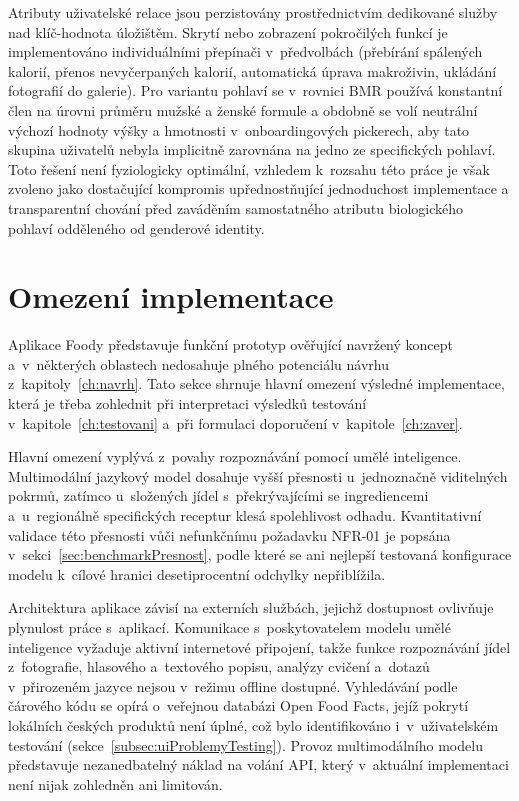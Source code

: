 Atributy uživatelské relace jsou perzistovány prostřednictvím dedikované služby nad klíč-hodnota úložištěm.
Skrytí nebo zobrazení pokročilých funkcí je implementováno individuálními přepínači v~předvolbách (přebírání spálených kalorií, přenos nevyčerpaných kalorií, automatická úprava makroživin, ukládání fotografií do galerie).
Pro variantu pohlaví  se v~rovnici BMR používá konstantní člen na úrovni průměru mužské a ženské formule a obdobně se volí neutrální výchozí hodnoty výšky a hmotnosti v~onboardingových pickerech, aby tato skupina uživatelů nebyla implicitně zarovnána na jedno ze specifických pohlaví.
Toto řešení není fyziologicky optimální, vzhledem k~rozsahu této práce je však zvoleno jako dostačující kompromis upřednostňující jednoduchost implementace a transparentní chování před zaváděním samostatného atributu biologického pohlaví odděleného od genderové identity.

\section{Omezení implementace}
\label{sec:omezeniImplementace}

Aplikace Foody představuje funkční prototyp ověřující navržený koncept a~v~některých oblastech nedosahuje plného potenciálu návrhu z~kapitoly~\ref{ch:navrh}.
Tato sekce shrnuje hlavní omezení výsledné implementace, která je třeba zohlednit při interpretaci výsledků testování v~kapitole~\ref{ch:testovani} a~při formulaci doporučení v~kapitole~\ref{ch:zaver}.

Hlavní omezení vyplývá z~povahy rozpoznávání pomocí umělé inteligence.
Multimodální jazykový model dosahuje vyšší přesnosti u~jednoznačně viditelných pokrmů, zatímco u~složených jídel s~překrývajícími se ingrediencemi a~u~regionálně specifických receptur klesá spolehlivost odhadu.
Kvantitativní validace této přesnosti vůči nefunkčnímu požadavku NFR-01 je popsána v~sekci~\ref{sec:benchmarkPresnost}, podle které se ani nejlepší testovaná konfigurace modelu k~cílové hranici desetiprocentní odchylky nepřiblížila.

Architektura aplikace závisí na externích službách, jejichž dostupnost ovlivňuje plynulost práce s~aplikací.
Komunikace s~poskytovatelem modelu umělé inteligence vyžaduje aktivní internetové připojení, takže funkce rozpoznávání jídel z~fotografie, hlasového a~textového popisu, analýzy cvičení a~dotazů v~přirozeném jazyce nejsou v~režimu offline dostupné.
Vyhledávání podle čárového kódu se opírá o~veřejnou databázi Open Food Facts, jejíž pokrytí lokálních českých produktů není úplné, což bylo identifikováno i~v~uživatelském testování (sekce~\ref{subsec:uiProblemyTesting}).
Provoz multimodálního modelu představuje nezanedbatelný náklad na volání API, který v~aktuální implementaci není nijak zohledněn ani limitován.

